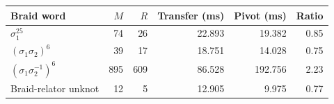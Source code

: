 \begin{center}\small
\begin{tabular}{lrrrrr}
\toprule
Braid word & $M$ & $R$ & Transfer (ms) & Pivot (ms) & Ratio\\\midrule
$\sigma_1^{25}$ & 74 & 26 & 22.893 & 19.382 & 0.85\\
$(\sigma_1\sigma_2)^6$ & 39 & 17 & 18.751 & 14.028 & 0.75\\
$(\sigma_1\sigma_2^{-1})^6$ & 895 & 609 & 86.528 & 192.756 & 2.23\\
Braid-relator unknot & 12 & 5 & 12.905 & 9.975 & 0.77\\
\bottomrule
\end{tabular}
\end{center}
